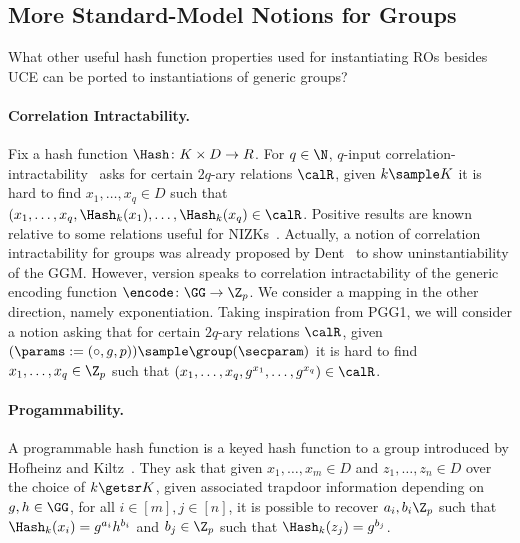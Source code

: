 {\begin{itemize}

\iffalse
\subsection{More Standard-Model Notions for Groups} \label{sec-port}

\begin{ques}
    What other useful hash function properties used for instantiating ROs besides UCE can be ported to instantiations of generic groups?
\end{ques}

\paragraph*{Correlation Intractability.}  Fix a hash function $\Hash \colon K \times D \to R$.  For $q\in\N$, $q$-input correlation-intractability~\cite{} asks for certain $2q$-ary relations $\calR$, given $k \sample K$ it is hard to find $x_1,\ldots,x_q \in D$ such that $(x_1,\ldots,x_q,\Hash_k(x_1),\ldots,\Hash_k(x_q) \in \calR$.  Positive results are known relative to some relations useful for NIZKs~\cite{}. 
Actually, a notion of correlation intractability for groups was already proposed by Dent~\cite{} to show uninstantiability of the GGM. 
However, version speaks to correlation intractability of the generic encoding function $\encode \colon \GG \to \Z_p$.   We consider a mapping in the other direction, namely exponentiation.
Taking inspiration from PGG1, we will  consider a notion asking that for certain  $2q$-ary relations $\calR$, given $(\params := (\circ, g, p)) \sample \group(\secparam)$ it is hard to find $x_1,\ldots,x_q \in \Z_p$ such that $(x_1,\ldots,x_q,g^{x_1},\ldots,g^{x_q}) \in \calR$. %

\paragraph*{Progammability.}
A programmable hash function is a keyed hash function to a group introduced by Hofheinz and Kiltz~\cite{}.   They ask that given $x_1,\ldots,x_m \in D$ and $z_1,\ldots,z_n \in D$ over the choice of $k \getsr K$, given associated trapdoor information depending on $g, h\in\GG$, for all $i\in [m], j\in[n]$, it is possible to recover $a_i,b_i \Z_p$ such that $\Hash_k(x_i) = g^{a_i} h^{b_i}$ and $b_j \in \Z_p$ such that $\Hash_k(z_j) = g^{b_j}$.   %


\end{itemize}}
